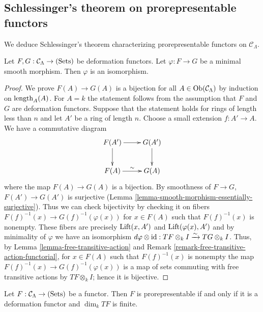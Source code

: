 \subsection{Schlessinger's theorem on prorepresentable functors}
\label{subsection-schlessingers-theorem}

\noindent
We deduce Schlessinger's theorem characterizing prorepresentable functors on 
$\mathcal C_{\Lambda}$.

\begin{lemma}
\label{lemma-minimal-smooth-morphism-functors}
Let $F,G: \mathcal C_{\Lambda} \rightarrow \textnormal{(Sets)}$ be deformation 
functors.  Let $\varphi: F \rightarrow G$ be a minimal smooth morphism. Then 
$\varphi$ is an isomorphism.
\end{lemma}

\begin{proof}
We prove $F(A) \rightarrow G(A)$ is a bijection for all $A \in 
\textnormal{Ob}(\mathcal C_{\Lambda})$ by induction on 
$\textnormal{length}_{A}(A)$.  For $A = k$ the statement follows from the 
assumption that $F$ and $G$ are deformation functors. Suppose that the 
statement holds for rings of length less than $n$ and let $A'$ be a ring of 
length $n$. Choose a small extension $f: A' \rightarrow A$.  We have a 
commutative diagram
\[
\xymatrix{
F(A') \ar[r] \ar[d] & G(A') \ar[d] \\
F(A) \ar[r]^{\sim} & G(A)
}
\]
where the map $F(A) \rightarrow G(A)$ is a bijection.  By smoothness of $F 
\rightarrow G$, $F(A') \rightarrow G(A')$ is surjective (Lemma 
\ref{lemma-smooth-morphism-essentially-surjective}).  Thus we can check 
bijectivity by checking it on fibers $F(f)^{-1}(x) \rightarrow 
G(f)^{-1}(\varphi(x))$ for $x \in F(A)$ such that $F(f)^{-1}(x)$ is nonempty.  
These fibers are precisely $\textnormal{Lift}(x,A')$ and 
$\textnormal{Lift}(\varphi(x),A')$ and by minimality of $\varphi$ we have an 
isomorphism $d\varphi \otimes \textnormal{id}: TF \otimes_{k} I 
\xrightarrow{\sim} TG \otimes_{k} I$.  Thus, by Lemma 
\ref{lemma-free-transitive-action} and Remark 
\ref{remark-free-transitive-action-functorial}, for $x \in F(A)$ such that 
$F(f)^{-1}(x)$ is nonempty the map $F(f)^{-1}(x) \rightarrow 
G(f)^{-1}(\varphi(x))$ is a map of sets commuting with free transitive actions 
by $TF \otimes_{k} I$; hence it is bijective.
\end{proof}

\begin{theorem}
\label{lemma-Schlessinger-prorepresentability}
Let $F: \mathcal C_{\Lambda} \rightarrow \textnormal{(Sets)}$ be a functor.  
Then $F$ is prorepresentable if and only if it is a deformation functor and 
$\dim_k TF$ is finite.
\end{theorem}

